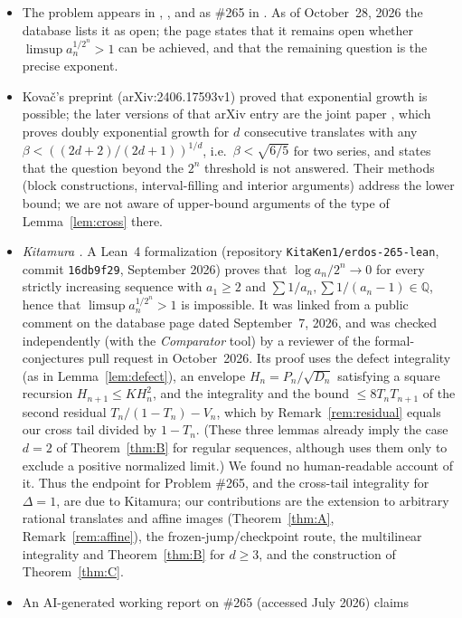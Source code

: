 \documentclass[11pt]{amsart}
\theoremstyle{definition}
\theoremstyle{remark}
\newcommand{\Q}{\mathbb{Q}}
\begin{document}
\begin{itemize}[leftmargin=1.4em]
\item The problem appears in \cite[p.~64]{ErGr80}, \cite[p.~334]{Er85},
\cite[pp.~104--105]{Er88} and as \#265 in \cite{Bloom265}. As of October~28, 2026 the
database lists it as open; the page states that it remains open whether
$\limsup a_n^{1/2^n}>1$ can be achieved, and that the remaining question is the precise
exponent.
\item Kova\v{c}'s preprint \cite{Kov24} (arXiv:2406.17593v1) proved that exponential
growth is possible; the later versions of that arXiv entry are the joint paper
\cite{KT25}, which proves doubly exponential growth for $d$ consecutive translates with
any $\beta<((2d+2)/(2d+1))^{1/d}$, i.e.\ $\beta<\sqrt{6/5}$ for two series, and states
that the question beyond the $2^n$ threshold is not answered. Their methods (block
constructions, interval-filling and interior arguments) address the lower bound; we are
not aware of upper-bound arguments of the type of Lemma~\ref{lem:cross} there.
\item \emph{Kitamura \cite{Kit26}.} A Lean~4 formalization (repository
\texttt{KitaKen1/erdos-265-lean}, commit \texttt{16db9f29}, September 2026) proves that
$\log a_n/2^n\to0$ for every strictly increasing sequence with $a_1\ge2$ and
$\sum1/a_n,\sum1/(a_n-1)\in\Q$, hence that $\limsup a_n^{1/2^n}>1$ is impossible. It was
linked from a public comment on the database page dated September~7, 2026, and was
checked independently (with the \emph{Comparator} tool) by a reviewer of the
formal-conjectures pull request \cite{FC6839} in October~2026. Its proof uses the
defect integrality (as in Lemma~\ref{lem:defect}), an envelope $H_n=P_n/\sqrt{D_n}$
satisfying a square recursion $H_{n+1}\le K H_n^2$, and the integrality and the bound
$\le8T_nT_{n+1}$ of the second residual $T_n/(1-T_n)-V_n$, which by
Remark~\ref{rem:residual} equals our cross tail divided by $1-T_n$. (These three lemmas
already imply the case $d=2$ of Theorem~\ref{thm:B} for regular sequences, although
\cite{Kit26} uses them only to exclude a positive normalized limit.) We found no
human-readable account of it. Thus the endpoint for Problem \#265, and the
cross-tail integrality for $\Delta=1$, are due to Kitamura; our contributions are the
extension to arbitrary rational translates and affine images (Theorem~\ref{thm:A},
Remark~\ref{rem:affine}), the frozen-jump/checkpoint route, the multilinear
integrality and Theorem~\ref{thm:B} for $d\ge3$, and the construction of
Theorem~\ref{thm:C}.
\item An AI-generated working report \cite{EPAD265} on \#265 (accessed July 2026) claims

\end{itemize}
\end{document}
